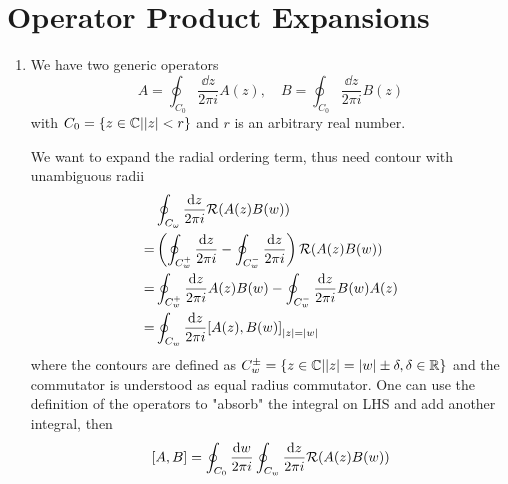 \section{Operator Product Expansions}
\begin{enumerate}[label=(\alph*)]
	\item We have two generic operators 
		\begin{equation}
			A = \oint_{C_0} \frac{\dd{z}}{2\pi i} A(z), \quad B = \oint_{C_0} \frac{\dd{z}}{2\pi i} B(z)
		\end{equation}
		with $C_0 = \{ z \in \mathbb{C} | |z| < r  \}$ and $r$ is an arbitrary real number. 

		We want to expand the radial ordering term, thus need contour with unambiguous radii
		\begin{align}
			& \oint_{C_\omega} \frac{\dd{z}}{2\pi i }\mathcal{R}(A(z)B(w)) \notag \\
			=& \left( \oint_{C_{w}^+} \frac{\dd{z}}{2\pi i} - \oint_{C_{w}^-} \frac{\dd{z}}{2\pi i} \right) \mathcal{R}(A(z)B(w)) \notag\\
			=& \oint_{C_w^+} \frac{\dd{z}}{2\pi i}A(z) B(w) - \oint_{C_{w}^-} \frac{\dd{z}}{2\pi i} B(w) A(z) \notag\\
			=& \oint_{C_w} \frac{\dd{z}}{2\pi i} \comm{A(z)}{B(w)}_{|z| = |w|} \label{math:R_comm}
		\end{align}
		where the contours are defined as $C^\pm_w = \{z \in \mathbb{C} | |z| = |w| \pm \delta, \delta \in \mathbb{R} \}$ and the commutator is understood as equal radius commutator. One can use the definition of the operators to "absorb" the integral on LHS and add another integral, then
		\begin{equation}
			\comm{A}{B} = \oint_{C_0} \frac{\dd{w}}{2\pi i} \oint_{C_w} \frac{\dd{z}}{2\pi i} \mathcal{R}(A(z)B(w))
		\end{equation}


\end{enumerate}

